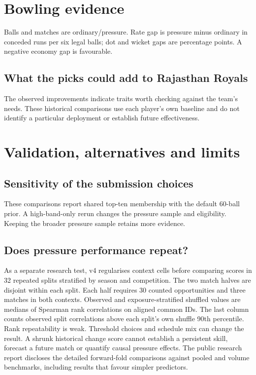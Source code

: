 \documentclass[11pt,a4paper]{article}
\begin{document}
\clearpage
\section*{Bowling evidence}
Balls and matches are ordinary/pressure. Rate gap is pressure minus ordinary in conceded runs per six legal balls; dot and wicket gaps are percentage points. A negative economy gap is favourable.
\BowlerEvidence
\subsection*{What the picks could add to Rajasthan Royals}
The observed improvements indicate traits worth checking against the team's needs. These historical comparisons use each player's own baseline and do not identify a particular deployment or establish future effectiveness.
\BowlerFit

\clearpage
\section*{Validation, alternatives and limits}
\subsection*{Sensitivity of the submission choices}
These comparisons report shared top-ten membership with the default 60-ball prior. A high-band-only rerun changes the pressure sample and eligibility. Keeping the broader pressure sample retains more evidence.
\SensitivityTable

\subsection*{Does pressure performance repeat?}
As a separate research test, v4 regularises context cells before comparing scores in 32 repeated splits stratified by season and competition. The two match halves are disjoint within each split. Each half requires 30 counted opportunities and three matches in both contexts. Observed and exposure-stratified shuffled values are medians of Spearman rank correlations on aligned common IDs. The last column counts observed split correlations above each split's own shuffle 90th percentile.
\RepeatTable
Rank repeatability is weak. Threshold choices and schedule mix can change the result. A shrunk historical change score cannot establish a persistent skill, forecast a future match or quantify causal pressure effects. The public research report discloses the detailed forward-fold comparisons against pooled and volume benchmarks, including results that favour simpler predictors.
\end{document}
